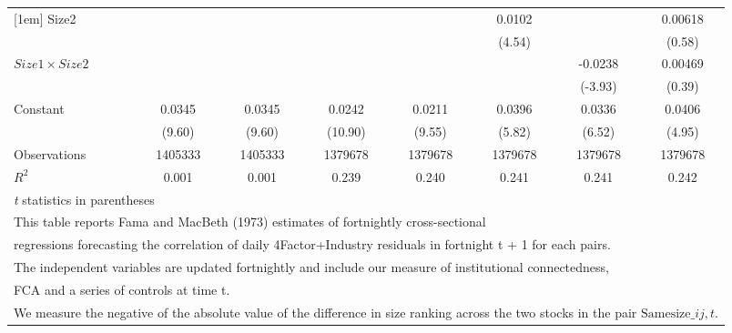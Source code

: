 {\begin{tabular}{l*{7}{c}}
[1em]
Size2               &                     &                     &                     &                     &      0.0102\sym{***}&                     &     0.00618         \\
                    &                     &                     &                     &                     &      (4.54)         &                     &      (0.58)         \\
[1em]
$ Size1 \times Size2 $&                     &                     &                     &                     &                     &     -0.0238\sym{***}&     0.00469         \\
                    &                     &                     &                     &                     &                     &     (-3.93)         &      (0.39)         \\
[1em]
Constant            &      0.0345\sym{***}&      0.0345\sym{***}&      0.0242\sym{***}&      0.0211\sym{***}&      0.0396\sym{***}&      0.0336\sym{***}&      0.0406\sym{***}\\
                    &      (9.60)         &      (9.60)         &     (10.90)         &      (9.55)         &      (5.82)         &      (6.52)         &      (4.95)         \\
\hline
Observations        &     1405333         &     1405333         &     1379678         &     1379678         &     1379678         &     1379678         &     1379678         \\
\(R^{2}\)           &       0.001         &       0.001         &       0.239         &       0.240         &       0.241         &       0.241         &       0.242         \\
\hline\hline
\multicolumn{8}{l}{\footnotesize \textit{t} statistics in parentheses}\\
\multicolumn{8}{l}{\footnotesize This table reports Fama and MacBeth (1973) estimates of fortnightly cross-sectional}\\
\multicolumn{8}{l}{\footnotesize  regressions forecasting the correlation of daily 4Factor+Industry residuals in fortnight t + 1 for each pairs.}\\
\multicolumn{8}{l}{\footnotesize The independent variables are updated fortnightly and include our measure of institutional connectedness,}\\
\multicolumn{8}{l}{\footnotesize  FCA and a series of controls at time t.}\\
\multicolumn{8}{l}{\footnotesize We measure the negative of the absolute value of the difference in size ranking across the two stocks in the pair $ \text{Samesize}\_{ij,t} $.}\\

\end{tabular}}
